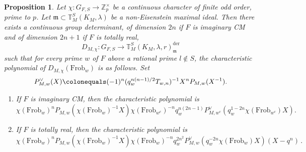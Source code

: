 \documentclass{amsart}
\newtheorem{prop}[subsubsection]{Proposition}
\theoremstyle{remark}
\numberwithin{equation}{subsection}
\newcommand{\Z}{\ZZ}
\newcommand{\m}{\frakm}
\newcommand{\ZZ}{{\mathbb Z}}
\newcommand{\frakm}{\mathfrak{m}}
\newcommand{\Frob}{\mathrm{Frob}}
\newcommand{\defeq}{\colonequals}
\renewcommand{\(}{\left(}
\renewcommand{\)}{\right)}
\begin{document}
\begin{prop}\label{big determinant} Let $\chi\colon G_{F,S}\to \Z_p^\times$ be a continuous character of finite odd order, prime to $p$.  Let $\m\subset \mathbb{T}^S_M(K_M,\lambda)$ be a non-Eisenstein maximal ideal. Then there exists a continuous group determinant, of dimension $2n$ if $F$ is imaginary CM and of dimension $2n+1$ if $F$ is totally real,  
\[
D_{M, \chi}\colon G_{F,S}\to \mathbb{T}^S_M(K_M, \lambda, r)_{\m}^{\mathrm{der}}
\]
such that for every prime $w$ of $F$ above a rational prime $l\not \in S$, the characteristic polynomial of $D_{M,\chi}(\mathrm{Frob}_{w})$ is as follows.
Set
\[
P^{\vee}_{M,w}(X)\defeq (-1)^n (q^{n(n-1)/2}_wT_{w,n})^{-1}X^nP_{M,w}(X^{-1}).
\] 
\begin{enumerate}
\item
If $F$ is imaginary CM, then the characteristic polynomial is
\[
\chi(\Frob_w)^nP_{M,w}(\chi(\Frob_{w})^{-1}X)\chi(\Frob_{w^c})^{-n}q^{n(2n-1)}_wP^{\vee}_{M,w^c}(q_{w}^{1-2n}\chi(\Frob_{w^c})X).
\]
\item If $F$ is totally real, then the characteristic polynomial is
\[
\chi(\Frob_w)^n P_{M,w}(\chi(\Frob_w)^{-1} X) \chi(\Frob_w)^{-n} q_w^{2n^2} P^{\vee}_{M,w}(q_w^{-2n} \chi(\Frob_w)X)(X-q^n) \,.
\]
\end{enumerate}  
\end{prop}
\end{document}
